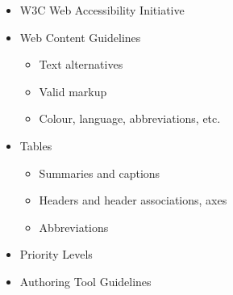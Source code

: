 \documentclass[landscape,20pt]{foils}
\newcommand{\jhead}[1]{\foilhead{\flushleft \textcolor{blue}{\large   #1}
\vspace{-1.9cm} 
\textcolor{blue}{\rule{25cm}{0.5mm}}
}}
\begin{document}

\begin{itemize}

\item W3C Web Accessibility Initiative

\item Web Content Guidelines

\begin{itemize}

\item Text alternatives

\item Valid markup

\item Colour, language, abbreviations, etc.

\end{itemize}

\item Tables

\begin{itemize}

\item Summaries and captions

\item Headers and header associations, axes

\item Abbreviations

\end{itemize}

\item Priority Levels

\item Authoring Tool Guidelines

\end{itemize}




\jhead{Requirements}

\setcounter{page}{4}

\end{document}
